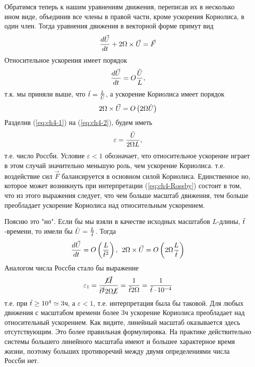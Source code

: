 Обратимся теперь к нашим уравнениям движения, переписав их в несколько ином виде, объединив все члены в правой части, кроме ускорения Кориолиса, в один член. Тогда уравнения движения в векторной форме примут вид
\[
    \displaystyle\frac{d \vec{U}}{d t}+2\Omega\times\vec{U}=\vec{F}
\]
Относительное ускорения имеет порядок 
\begin{equation}
\label{eq:ch4-1}
    \displaystyle\frac{d \vec{U}}{d t}=O\frac{\Tilde{U}}{L},
\end{equation}
т.к. мы приняли выше, что $\Tilde{t}=\frac{L}{\Tilde{U}}$, а ускорение Кориолиса имеет порядок
\begin{equation}
    \label{eq:ch4-2}
    2\Omega\times\vec{U}=O\left(2 \Omega \Tilde{U}\right)
\end{equation}
Разделив (\ref{eq:ch4-1}) на (\ref{eq:ch4-2}), будем иметь
\begin{equation}
    \label{eq:ch4-Rossby}
    \varepsilon=\frac{\Tilde{U}}{2\Omega L},
\end{equation}
т.е. число Россби. Условие $\varepsilon<1$ обозначает, что относительное ускорение играет в этом случай значительно меньшую роль, чем ускорение Кориолиса. т.е. воздействие сил $\vec{F}$ балансируется в основном силой Кориолиса. Единственное но, которое может возникнуть при интерпретации (\ref{eq:ch4-Rossby}) состоит в том, что из этого выражения следует, что чем больше масштаб движения, тем больше преобладает ускорение Кориолиса над относительным ускорением.

Поясню это "но". Если бы мы взяли в качестве исходных масштабов $L$-длины, $\Tilde{t}$-времени, то имели бы $\Tilde{U}=\frac{L}{\Tilde{t}}$.  Тогда
\[
\displaystyle\frac{d \vec{U}}{d t}=O\left(\frac{L}{\Tilde{t}^2}\right), \:\: 2\Omega\times\vec{U}=O\left( 2\Omega\frac{L}{\Tilde{t}}\right)
\]
Аналогом числа Россби стало бы выражение 
\[
\varepsilon_1=\frac{\cancel{L} \cancel{\Tilde{t}}}{\Tilde{t}^{\cancel{2}} 2 \Omega \cancel{L} }=\frac{1}{\Tilde{t} 2 \Omega}=\frac{1}{\Tilde{t}\cdot 10^{-4}}
\]
т.е. при $\Tilde{t}\geq 10^4\simeq3$ч, а $\varepsilon<1$, т.е. интерпретация была бы таковой. Для любых движения с масштабом времени более 3ч ускорение Кориолиса преобладает над относительный ускорением. Как видите, линейный масштаб оказывается здесь отсутствующим. Это более правильная формулировка. На практике действительно системы большего линейного масштаба имеют и большее характерное время жизни, поэтому больших противоречий между двумя определениями числа Россби нет. 

